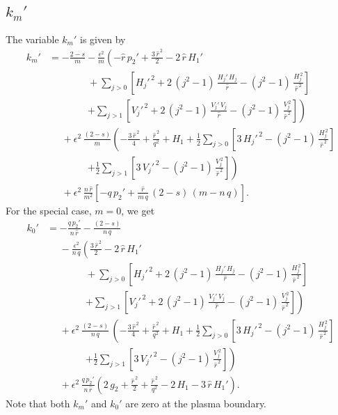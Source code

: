 \documentclass[12pt,prb,aps,notitlepage]{revtex4-1}
\begin{document}
\subsection{$k_m'$}
The variable $k_m'$ is given by 
\begin{align}
k_m'&= -\frac{2-s}{m}
-\frac{\epsilon^2}{m}\left(-\hat{r}\,p_2'+
\frac{3\,\hat{r}^{\,2}}{2}-2\,\hat{r}\,H_1'\right.\nonumber\\[0.5ex]
&\phantom{===}
+\sum_{j>0}\left[H_j'^{\,2}+2\,(j^2-1)\,\frac{H_j'\,H_j}{\hat{r}}-(j^2-1)\,\frac{H_j^{\,2}}{\hat{r}^{\,2}}\right]\nonumber\\[0.5ex]
&\phantom{===}\left.+\sum_{j>1}\left[V_j'^{\,2}+2\,(j^2-1)\,\frac{V_j'\,V_j}{\hat{r}}-(j^2-1)\,\frac{V_j^{\,2}}{\hat{r}^{\,2}}\right]\right)\nonumber\\[0.5ex]
&\phantom{=}
+\epsilon^2\,\frac{(2-s)}{m}\left(-\frac{3\,\hat{r}^{\,2}}{4} +\frac{\hat{r}^{\,2}}{q^2}+H_1 +\frac{1}{2}\sum_{j>0}\left[3\,H_j'^{\,2}- (j^2-1)\,\frac{H_j^{\,2}}{\hat{r}^{\,2}}\right]
\right.\nonumber\\[0.5ex]
&\phantom{===}\left.+\frac{1}{2}\sum_{j>1}\left[3\,V_j'^{\,2}- (j^2-1)\,\frac{V_j^{\,2}}{\hat{r}^{\,2}}\right]\right)\nonumber\\[0.5ex]
&\phantom{=}
+\epsilon^2\,\frac{n\,\hat{r}}{m^2}\left[-q\,p_2' + \frac{\hat{r}}{m\,q}\,(2-s)\,(m-n\,q)\right].
\end{align}
For the special case, $m=0$, we get
\begin{align}
k_0' &= - \frac{q\,p_2'}{n\,\hat{r}} - \frac{(2-s)}{n\,q} 
\nonumber\\[0.5ex]
&\phantom{=}-\frac{\epsilon^2}{n\,q}\left(
\frac{3\,\hat{r}^{\,2}}{2}-2\,\hat{r}\,H_1'\right.\nonumber\\[0.5ex]
&\phantom{===}
+\sum_{j>0}\left[H_j'^{\,2}+2\,(j^2-1)\,\frac{H_j'\,H_j}{\hat{r}}-(j^2-1)\,\frac{H_j^{\,2}}{\hat{r}^{\,2}}\right]\nonumber\\[0.5ex]
&\phantom{===}\left.+\sum_{j>1}\left[V_j'^{\,2}+2\,(j^2-1)\,\frac{V_j'\,V_j}{\hat{r}}-(j^2-1)\,\frac{V_j^{\,2}}{\hat{r}^{\,2}}\right]\right)\nonumber\\[0.5ex]
&\phantom{=}
+\epsilon^2\,\frac{(2-s)}{n\,q}\,\left(-\frac{3\,\hat{r}^{\,2}}{4} +\frac{\hat{r}^{\,2}}{q^2}+H_1 +\frac{1}{2}\sum_{j>0}\left[3\,H_j'^{\,2}- (j^2-1)\,\frac{H_j^{\,2}}{\hat{r}^{\,2}}\right]
\right.\nonumber\\[0.5ex]
&\phantom{===}\left.+\frac{1}{2}\sum_{j>1}\left[3\,V_j'^{\,2}- (j^2-1)\,\frac{V_j^{\,2}}{\hat{r}^{\,2}}\right]\right)\nonumber\\[0.5ex]
&\phantom{=}
+\epsilon^2\,\frac{q\,p_2'}{n\,\hat{r}}\left(2\,g_2+\frac{\hat{r}^{\,2}}{2}+\frac{\hat{r}^{\,2}}{q^2}-2\,H_1-3\,\hat{r}\,H_1'\right).
\end{align}
Note that both $k_m'$ and $k_0'$ are zero at the plasma boundary. 
\end{document}
